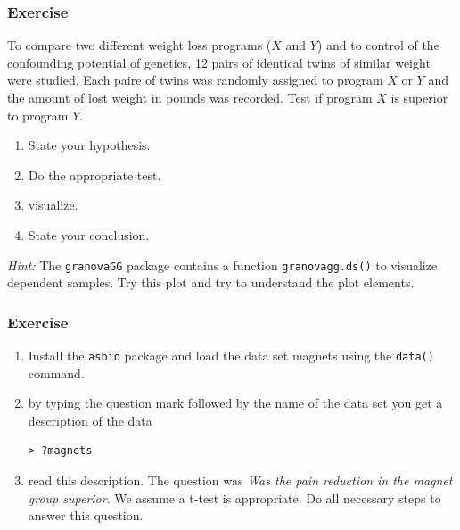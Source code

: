 \documentclass[xcolor={table}]{beamer}
\begin{document}
\begin{frame}[fragile]\frametitle{Exercise}
To compare two different weight loss programs ($X$ and $Y$) and to control of the confounding potential of genetics, 12 pairs of identical twins of similar weight were studied. Each paire of twins was randomly assigned to program $X$ or $Y$ and the amount of lost weight in pounds was recorded. Test if program $X$ is superior to program $Y$.
  \begin{enumerate}
  \item State your hypothesis.
  \item Do the appropriate test.
  \item visualize.
  \item State your conclusion.
  \end{enumerate}
\textit{Hint:} The \texttt{granovaGG} package contains a function \texttt{granovagg.ds()} to visualize dependent samples. Try this plot and try to understand the plot elements.
\end{frame}


\begin{frame}[fragile]\frametitle{Exercise}
  \begin{enumerate}
  \item Install the \texttt{asbio} package and load the data set magnets using the \texttt{data()} command.
  \item by typing the question mark followed by the name of the data set you get a description of the data
\begin{verbatim}
> ?magnets  
\end{verbatim}
\item read this description. The question was \textit{Was the pain reduction in the magnet group superior}. We assume a t-test is appropriate. Do all necessary steps to answer this question.
  \end{enumerate}
\end{frame}
\end{document}
